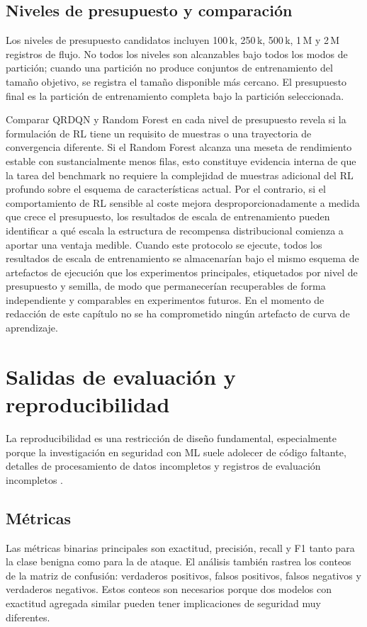\subsection{Niveles de presupuesto y comparación}
Los niveles de presupuesto candidatos incluyen 100\,k, 250\,k, 500\,k, 1\,M y 2\,M registros de flujo. No todos los niveles son alcanzables bajo todos los modos de partición; cuando una partición no produce conjuntos de entrenamiento del tamaño objetivo, se registra el tamaño disponible más cercano. El presupuesto final es la partición de entrenamiento completa bajo la partición seleccionada.

Comparar QRDQN y Random Forest en cada nivel de presupuesto revela si la formulación de RL tiene un requisito de muestras o una trayectoria de convergencia diferente. Si el Random Forest alcanza una meseta de rendimiento estable con sustancialmente menos filas, esto constituye evidencia interna de que la tarea del benchmark no requiere la complejidad de muestras adicional del RL profundo sobre el esquema de características actual. Por el contrario, si el comportamiento de RL sensible al coste mejora desproporcionadamente a medida que crece el presupuesto, los resultados de escala de entrenamiento pueden identificar a qué escala la estructura de recompensa distribucional comienza a aportar una ventaja medible. Cuando este protocolo se ejecute, todos los resultados de escala de entrenamiento se almacenarían bajo el mismo esquema de artefactos de ejecución que los experimentos principales, etiquetados por nivel de presupuesto y semilla, de modo que permanecerían recuperables de forma independiente y comparables en experimentos futuros. En el momento de redacción de este capítulo no se ha comprometido ningún artefacto de curva de aprendizaje.

\section{Salidas de evaluación y reproducibilidad}
La reproducibilidad es una restricción de diseño fundamental, especialmente porque la investigación en seguridad con ML suele adolecer de código faltante, detalles de procesamiento de datos incompletos y registros de evaluación incompletos \parencite{Olszewski2023ReproSecurityML}.

\subsection{Métricas}
Las métricas binarias principales son exactitud, precisión, recall y F1 tanto para la clase benigna como para la de ataque. El análisis también rastrea los conteos de la matriz de confusión: verdaderos positivos, falsos positivos, falsos negativos y verdaderos negativos. Estos conteos son necesarios porque dos modelos con exactitud agregada similar pueden tener implicaciones de seguridad muy diferentes.

